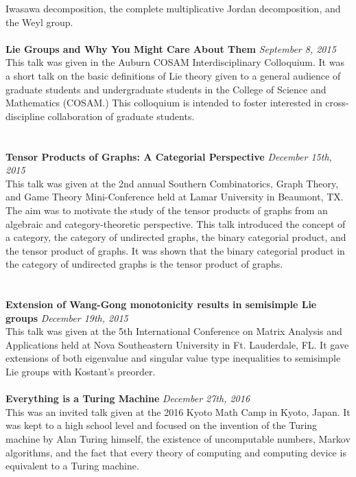 \documentclass{article}
\begin{document}
Iwasawa decomposition, the complete multiplicative Jordan decomposition, and the
Weyl group.
\\ \\
\textbf{Lie Groups and Why You Might Care About Them} \hfill \textit{September
  8, 2015} \\
This talk was given in the Auburn COSAM Interdisciplinary Colloquium. It was a
short talk on the basic definitions of Lie theory given to a general audience of
graduate students and undergraduate students in the College of Science and
Mathematics (COSAM.) This colloquium is intended to foster interested in
cross-discipline collaboration of graduate students.\\
\\ \\
\textbf{Tensor Products of Graphs: A Categorial Perspective} \hfill
\textit{December 15th, 2015} \\
This talk was given at the 2nd annual Southern Combinatorics, Graph Theory, and
Game Theory Mini-Conference held at Lamar University in Beaumont, TX. The aim
was to motivate the study of the tensor products of graphs from an algebraic and
category-theoretic perspective. This talk introduced the concept of a category,
the category of undirected graphs, the binary categorial product, and the tensor
product of graphs. It was shown that the binary categorial product in the
category of undirected graphs is the
tensor product of graphs. \\
\\ \\
\textbf{Extension of Wang-Gong monotonicity results in semisimple Lie groups}
\hfill \textit{December 19th, 2015} \\
This talk was given at the 5th International Conference on Matrix Analysis and
Applications held at Nova Southeastern University in Ft. Lauderdale, FL. It gave
extensions of both eigenvalue and singular value type inequalities to semisimple
Lie groups with Kostant's preorder. \\
\\
\textbf{Everything is a Turing Machine}
\hfill \textit{December 27th, 2016} \\
This was an invited talk given at the 2016 Kyoto Math Camp in Kyoto, Japan. It
was kept to a high school level and focused on the invention of the Turing
machine by Alan Turing himself, the existence of uncomputable numbers, Markov
algorithms, and the fact that every theory of computing and computing device is
equivalent to a Turing machine.
\end{document}
